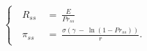 \begin{equation}
    \begin{cases}
        \begin{split}
        \ R_{ss} \
        & = \ \frac{E}{Pr_{ss}} \\
        \ \pi_{ss} \
        & = \ \frac{\sigma \left( \gamma \ - \ \ln(1 - Pr_{ss}) \right)}{r}.
        \end{split}
    \end{cases}
\label{Equation:Social-Planners-Problem_System-of-Equations-for-Steady-State}
\end{equation}